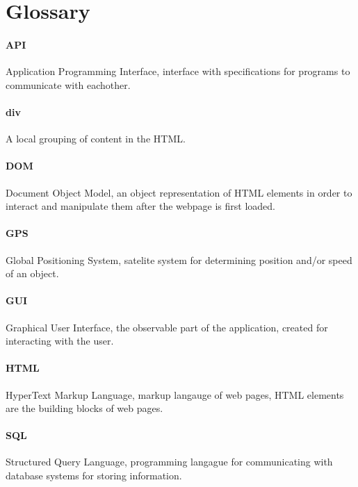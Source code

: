 \section{Glossary}

\paragraph{API} Application Programming Interface, interface with specifications for programs to communicate with eachother.

\paragraph{div} A local grouping of content in the HTML.

\paragraph{DOM} Document Object Model, an object representation of HTML elements in order to interact and manipulate them after the webpage is first loaded.

\paragraph{GPS} Global Positioning System, satelite system for determining position and/or speed of an object.

\paragraph{GUI} Graphical User Interface, the observable part of the application, created for interacting with the user.

\paragraph{HTML} HyperText Markup Language, markup langauge of web pages, HTML elements are the building blocks of web pages.

\paragraph{SQL} Structured Query Language, programming langague for communicating with database systems for storing information.
